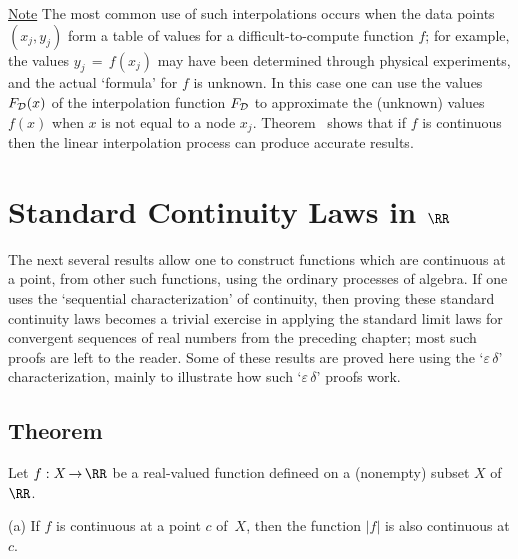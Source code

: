 {        \underline{Note} The most common use of such interpolations occurs when the data points $(x_{j},y_{j})$ form a table of values for a difficult-to-compute function $f$;
    for example, the values $y_{j} \,=\, f(x_{j})$ may have been determined through physical experiments, and the actual `formula' for $f$ is unknown.
    In this case one can use the values $F_{{\cal D}}(x)$ of the interpolation function $F_{{\cal D}}$
    to approximate the (unknown) values $f(x)$ when $x$ is not equal to a node $x_{j}$.
    Theorem~ shows that if $f$ is continuous then the linear interpolation process can produce accurate results.
}%

\VV

                \section{{\bf Standard Continuity Laws in ${\RR}$}}
                \label{SectD25}


\VV


        The next several results allow one to construct functions which are
    continuous at a point,
    from other such functions, using the ordinary processes of algebra. If one uses the `sequential characterization' of continuity,
    then proving these standard continuity laws becomes a trivial exercise in applying the standard limit laws
    for convergent sequences of real numbers from the preceding chapter; most such proofs are left to the reader.
    Some of these results are proved here using the `${\varepsilon}\,{\delta}$' characterization,
    mainly to illustrate how such `${\varepsilon}\,{\delta}$' proofs work.

\V

            \subsection{\small{\bf Theorem}}
            \label{ThmD20.60A}


\hspace*{\parindent} Let $f:X \,{\rightarrow}\, {\RR}$ be a real-valued function defineed on a (nonempty) subset $X$ of ${\RR}$.

\V

        (a) If $f$ is continuous at a point $c$ of~$X$, then the function $|f|$ is also continuous at $c$.

\V

